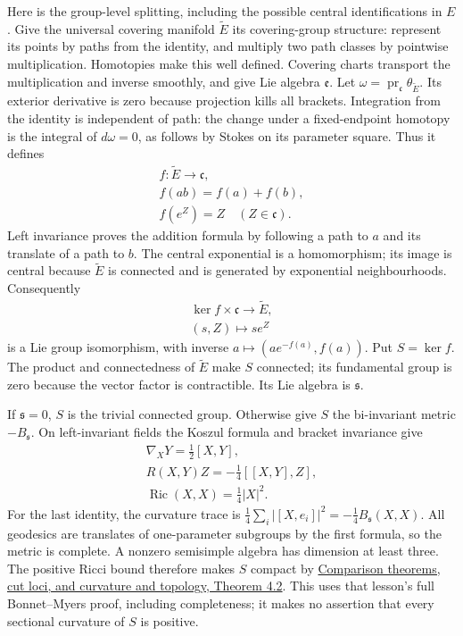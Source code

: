 \documentclass[
  11pt,
]{article}
\begin{document}
Here is the group-level splitting, including the possible central
identifications in \(E\). Give the universal covering manifold
\(\widetilde E\) its covering-group structure: represent its points by
paths from the identity, and multiply two path classes by pointwise
multiplication. Homotopies make this well defined. Covering charts
transport the multiplication and inverse smoothly, and give Lie algebra
\(\mathfrak e\). Let
\(\omega=\operatorname{pr}_{\mathfrak c}\theta_{\widetilde E}\). Its
exterior derivative is zero because projection kills all brackets.
Integration from the identity is independent of path: the change under a
fixed-endpoint homotopy is the integral of \(d\omega=0\), as follows by
Stokes on its parameter square. Thus it defines \[
\begin{gathered}
f:\widetilde E\longrightarrow\mathfrak c,\\
f(ab)=f(a)+f(b),\\
f(e^Z)=Z\quad(Z\in\mathfrak c).
\end{gathered}
\tag{12.42}
\] Left invariance proves the addition formula by following a path to
\(a\) and its translate of a path to \(b\). The central exponential is a
homomorphism; its image is central because \(\widetilde E\) is connected
and is generated by exponential neighbourhoods. Consequently \[
\begin{gathered}
\ker f\times\mathfrak c\longrightarrow\widetilde E,\\
(s,Z)\longmapsto s e^Z
\end{gathered}
\tag{12.43}
\] is a Lie group isomorphism, with inverse
\(a\mapsto(a e^{-f(a)},f(a))\). Put \(S=\ker f\). The product and
connectedness of \(\widetilde E\) make \(S\) connected; its fundamental
group is zero because the vector factor is contractible. Its Lie algebra
is \(\mathfrak s\).

If \(\mathfrak s=0\), \(S\) is the trivial connected group. Otherwise
give \(S\) the bi-invariant metric \(-B_{\mathfrak s}\). On
left-invariant fields the Koszul formula and bracket invariance give \[
\begin{gathered}
\nabla_XY=\tfrac12[X,Y],\\
R(X,Y)Z=-\tfrac14[[X,Y],Z],\\
\operatorname{Ric}(X,X)=\tfrac14|X|^2.
\end{gathered}
\tag{12.44}
\] For the last identity, the curvature trace is
\(\tfrac14\sum_i|[X,e_i]|^2=-\tfrac14B_{\mathfrak s}(X,X)\). All
geodesics are translates of one-parameter subgroups by the first
formula, so the metric is complete. A nonzero semisimple algebra has
dimension at least three. The positive Ricci bound therefore makes \(S\)
compact by
\href{https://kokunoyumeto.github.io/open-math-courses/courses/DG-FND/comparison-theorems-cut-loci-and-curvature-and-topology.html}{Comparison
theorems, cut loci, and curvature and topology, Theorem 4.2}. This uses
that lesson's full Bonnet--Myers proof, including completeness; it makes
no assertion that every sectional curvature of \(S\) is positive.
\end{document}
